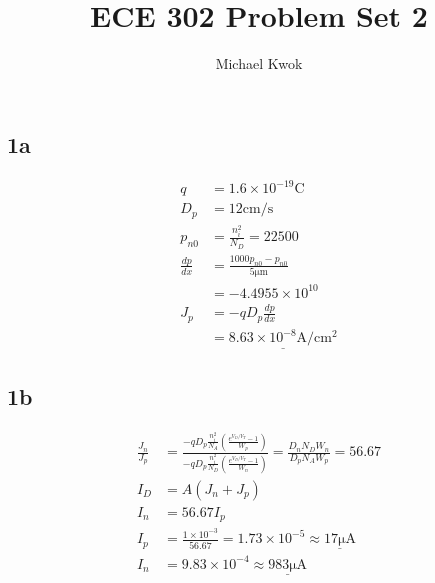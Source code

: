 \documentclass{article}
\title{ECE 302 Problem Set 2}
\author{Michael Kwok}
\begin{document}
\maketitle
\begin{multicols}{2}
    \subsection*{1a}
    \begin{align*}
        q             & = 1.6 \times 10^{-19}\si{\coulomb}                                    \\
        D_p           & = 12 \si{\centi\metre\per\second}                                     \\
        p_{n0}        & = \frac{n_i^2}{N_D} = 22500                                           \\
        \frac{dp}{dx} & = \frac{1000 p_{n0} - p_{n0}}{5\si{\micro\metre}}                     \\
                      & = -4.4955\times 10^{10}                                               \\
        J_p           & = - q D_p \frac{dp}{dx}                                               \\
                      & = \underline{8.63\times 10^{-8} \si{\ampere\per\centi\metre\squared}}
    \end{align*}
    \subsection*{1b}
    \begin{align*}
        \frac{J_n}{J_p} & = \frac{- q D_p \frac{n_i^2}{N_A}\left(\frac{e^{V_D/V_T} - 1}{W_p}\right)}{- q D_p \frac{n_i^2}{N_D}\left(\frac{e^{V_D/V_T} - 1}{W_n}\right)} = \frac{D_n N_D W_n}{D_p N_A W_p} = 56.67 \\
        I_D             & = A\left(J_n + J_p\right)                                                                                                                                                               \\
        I_n             & = 56.67 I_p                                                                                                                                                                             \\
        I_p             & = \frac{1\times 10^{-3}}{56.67} = 1.73\times 10^{-5} \approx \underline{17\si{\micro\ampere}}                                                                                           \\
        I_n             & = 9.83\times 10^{-4} \approx \underline{983 \si{\micro\ampere}}
    \end{align*}

\end{multicols}
\end{document}
